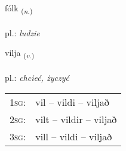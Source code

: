 \documentclass[frontgrid, backgrid]{flacards}\usepackage[]{graphicx}\usepackage[]{xcolor}
\begin{document}
{fólk \small{\textsubscript{(\textit{n.})}} \\[1ex] %
\textphonetic{[foul̥k]} \\
pl.: \emph{ludzie} \\  [2ex]
\renewcommand*{\arraystretch}{0.8}
}

\renewcommand{\flhead}{\vskip5pt \fboxsep=0pt {\small\bfseries\footnotesize Sagnorð | czasownik}}
\renewcommand{\fcfoot}{\vskip5pt \fboxsep=0pt \hspace{2pt}{\small\bfseries\footnotesize 1K}}

\renewcommand{\blhead}{\vskip5pt {\small\bfseries\footnotesize Sagnorð | czasownik }}
\renewcommand{\bcfoot}{\vskip5pt \hspace{2pt}{\small\bfseries\footnotesize 1K}}


{vilja \small{\textsubscript{(\textit{v.})}} \\[1ex] %
\textphonetic{[vɪlja]} \\
pl.: \emph{chcieć, życzyć} \\  [2ex]
\renewcommand*{\arraystretch}{0.8}
\begin{tabular}{p{1cm}l}
\textsc{1sg}: & vil -- vildi -- viljað \\ 
\textsc{2sg}: & vilt -- vildir -- viljað \\ 
\textsc{3sg}: & vill -- vildi -- viljað \\ 
\end{tabular}
}

\renewcommand{\flhead}{\vskip5pt \fboxsep=0pt {\small\bfseries\footnotesize Lýsingarorð | przymiotnik}}
\renewcommand{\fcfoot}{\vskip5pt \fboxsep=0pt \hspace{2pt}{\small\bfseries\footnotesize 1K}}

\renewcommand{\blhead}{\vskip5pt {\small\bfseries\footnotesize Lýsingarorð | przymiotnik }}
\renewcommand{\bcfoot}{\vskip5pt \hspace{2pt}{\small\bfseries\footnotesize 1K}}
\end{document}
